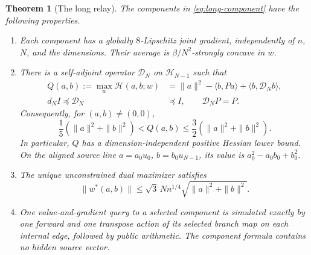 \documentclass[11pt,letterpaper]{article}
\newtheorem{theorem}{Theorem}[section]
\theoremstyle{definition}
\theoremstyle{remark}
\begin{document}
\begin{theorem}[The long relay]
\label{thm:long-relay}
The components in \eqref{eq:long-component} have the following properties.
\begin{enumerate}
\item Each component has a globally $8$-Lipschitz joint gradient,
independently of $n$, $N$, and the dimensions.  Their average is
$\beta/N^2$-strongly concave in $w$.
\item There is a self-adjoint operator $\mathcal D_N$ on
$\mathcal H_{N-1}$ such that
\begin{equation}
\begin{split}
 Q(a,b):=\max_w\mathcal H(a,b;w)
 &=\|a\|^2-\langle b,Pa\rangle
       +\langle b,\mathcal D_Nb\rangle,\\
 d_N I\preceq\mathcal D_N&\preceq I,
 \qquad \mathcal D_NP=P.
\end{split}
\label{eq:long-endpoint-energy}
\end{equation}
Consequently, for $(a,b)\ne(0,0)$,
\begin{equation}
 \frac15(\|a\|^2+\|b\|^2)
 <Q(a,b)\le\frac32(\|a\|^2+\|b\|^2).
 \label{eq:long-coercivity}
\end{equation}
In particular, $Q$ has a dimension-independent positive Hessian lower
bound.  On the aligned source line
$a=a_0u_0$, $b=b_0u_{N-1}$, its value is
$a_0^2-a_0b_0+b_0^2$.
\item The unique unconstrained dual maximizer satisfies
\begin{equation}
 \|w^*(a,b)\|
 \le\sqrt3\,Nn^{1/4}\sqrt{\|a\|^2+\|b\|^2}.
 \label{eq:long-dual-radius}
\end{equation}
\item One value-and-gradient query to a selected component is simulated
exactly by one forward and one transpose action of its selected branch
map on each internal edge, followed by public arithmetic.  The component
formula contains no hidden source vector.
\end{enumerate}
\end{theorem}
\end{document}
